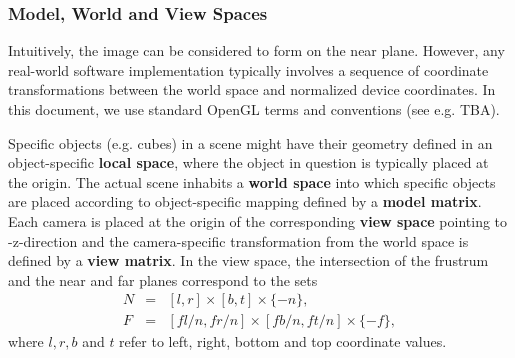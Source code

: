\documentclass [12pt, a4paper] {article}
\begin{document}
\subsubsection{Model, World and View Spaces}
Intuitively, the image can be considered to form on the near plane. However, any real-world 
software implementation typically involves a sequence of coordinate transformations 
between the world space and normalized device coordinates. In this document, we use 
standard OpenGL terms and conventions (see e.g. TBA). 

Specific objects (e.g. cubes) in a scene might have their geometry defined in an object-specific
\textbf{local space}, where the object in question is typically placed at the origin. 
The actual scene inhabits a \textbf{world space} into which specific objects are placed 
according to object-specific mapping defined by a \textbf{model matrix}. Each camera is placed 
at the origin of the corresponding \textbf{view space} pointing to -z-direction and the 
camera-specific transformation from the world space is defined by a \textbf{view matrix}.
In the view space, the intersection of the frustrum and the near and far planes correspond to the sets
\begin {eqnarray}
    N &=&
    [l, r]\times[b, t]\times\{-n\} ,
    \\
    F &=&
    [fl/n, fr/n]\times[fb/n, ft/n]\times\{-f\},
\end {eqnarray}
where $l, r, b$ and $t$ refer to left, right, bottom and top coordinate values.
\end{document}
